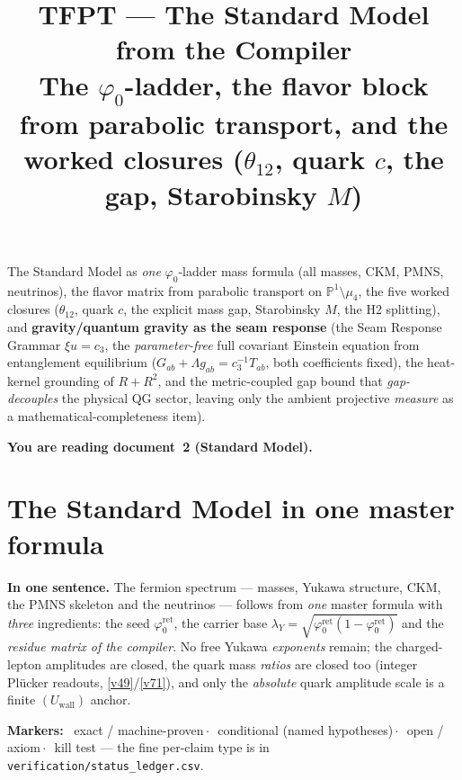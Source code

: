 \documentclass[11pt,a4paper]{article}
\title{\vspace{-1.2cm}\textbf{TFPT --- The Standard Model from the Compiler}\\[2mm]\large The $\varphi_0$-ladder, the flavor block from parabolic transport, and the worked closures ($\theta_{12}$, quark $c$, the gap, Starobinsky $M$)}
\author{\TFPTauthors}\date{\TFPTdatestamp}
\newcommand{\phiz}{\varphi_0^{\mathrm{ret}}}
\newcommand{\lamY}{\lambda_Y}
\theoremstyle{definition}
\begin{document}
\maketitle
\vspace{-0.4cm}

\begin{keybox}
The Standard Model as \emph{one} $\varphi_0$-ladder mass formula (all masses, CKM, PMNS, neutrinos), the
flavor matrix from parabolic transport on $\mathbb P^1\setminus\mu_4$, the five worked closures
($\theta_{12}$, quark $c$, the explicit mass gap, Starobinsky $M$, the H2 splitting), and
\textbf{gravity/quantum gravity as the seam response} (the Seam Response Grammar $\xi u=c_3$, the
\emph{parameter-free} full covariant Einstein equation from entanglement equilibrium ($G_{ab}{+}\Lambda g_{ab}{=}c_3^{-1}T_{ab}$, both coefficients fixed), the
heat-kernel grounding of $R+R^2$, and the metric-coupled gap bound that \emph{gap-decouples} the physical
QG sector, leaving only the ambient projective \emph{measure} as a mathematical-completeness item).
\end{keybox}


\noindent\textbf{You are reading \textbf{document~2} (Standard Model).}


\TFPTbadges
\TFPTclaimstack[sm]


\tableofcontents
\clearpage
\part{The Standard Model in one master formula}
\par\smallskip\noindent\textbf{In one sentence.}
The fermion spectrum --- masses, Yukawa structure, CKM, the PMNS skeleton and the neutrinos --- follows
from \emph{one} master formula with \emph{three} ingredients: the seed $\phiz$, the carrier base
$\lamY=\sqrt{\phiz(1-\phiz)}$ and the \emph{residue matrix of the compiler}. No free Yukawa \emph{exponents}
remain; the charged-lepton amplitudes are closed, the quark mass \emph{ratios} are closed too (integer
Pl\"ucker readouts, \vref{v49}/\vref{v71}), and only the \emph{absolute} quark amplitude scale is a finite
$(U_{\mathrm{wall}})$ anchor.

\noindent\textbf{Markers:} \mE\ exact / machine-proven\,$\cdot$\,\mC\ conditional (named hypotheses)\,$\cdot$\,\mO\ open / axiom\,$\cdot$\,\mX\ kill test --- the fine per-claim type is in \texttt{verification/status\_ledger.csv}.
\end{document}
